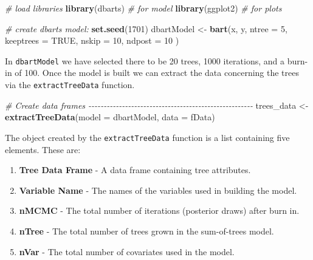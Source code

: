 \documentclass[
]{article}
\newenvironment{Shaded}{\begin{snugshade}}{\end{snugshade}}
\newcommand{\AttributeTok}[1]{\textcolor[rgb]{0.13,0.29,0.53}{#1}}
\newcommand{\CommentTok}[1]{\textcolor[rgb]{0.56,0.35,0.01}{\textit{#1}}}
\newcommand{\ConstantTok}[1]{\textcolor[rgb]{0.56,0.35,0.01}{#1}}
\newcommand{\DecValTok}[1]{\textcolor[rgb]{0.00,0.00,0.81}{#1}}
\newcommand{\FunctionTok}[1]{\textcolor[rgb]{0.13,0.29,0.53}{\textbf{#1}}}
\newcommand{\NormalTok}[1]{#1}
\newcommand{\OtherTok}[1]{\textcolor[rgb]{0.56,0.35,0.01}{#1}}
\providecommand{\tightlist}{%
  \setlength{\itemsep}{0pt}\setlength{\parskip}{0pt}}
\begin{document}
\begin{Shaded}
\begin{Highlighting}[]
\CommentTok{\# load libraries}
\FunctionTok{library}\NormalTok{(dbarts) }\CommentTok{\# for model}
\FunctionTok{library}\NormalTok{(ggplot2) }\CommentTok{\# for plots}
\end{Highlighting}
\end{Shaded}

\begin{Shaded}
\begin{Highlighting}[]

\CommentTok{\# create dbarts model:}
\FunctionTok{set.seed}\NormalTok{(}\DecValTok{1701}\NormalTok{)}
\NormalTok{dbartModel }\OtherTok{\textless{}{-}} \FunctionTok{bart}\NormalTok{(x,}
\NormalTok{                   y,}
                   \AttributeTok{ntree =} \DecValTok{5}\NormalTok{,}
                   \AttributeTok{keeptrees =} \ConstantTok{TRUE}\NormalTok{,}
                   \AttributeTok{nskip =} \DecValTok{10}\NormalTok{,}
                   \AttributeTok{ndpost =} \DecValTok{10}
\NormalTok{)}
\end{Highlighting}
\end{Shaded}

In \texttt{dbartModel} we have selected there to be 20 trees, 1000
iterations, and a burn-in of 100. Once the model is built we can extract
the data concerning the trees via the \texttt{extractTreeData} function.

\begin{Shaded}
\begin{Highlighting}[]
\CommentTok{\# Create data frames {-}{-}{-}{-}{-}{-}{-}{-}{-}{-}{-}{-}{-}{-}{-}{-}{-}{-}{-}{-}{-}{-}{-}{-}{-}{-}{-}{-}{-}{-}{-}{-}{-}{-}{-}{-}{-}{-}{-}{-}{-}{-}{-}{-}{-}{-}{-}{-}{-}{-}{-}{-}{-}{-}}
\NormalTok{trees\_data }\OtherTok{\textless{}{-}} \FunctionTok{extractTreeData}\NormalTok{(}\AttributeTok{model =}\NormalTok{ dbartModel, }\AttributeTok{data =}\NormalTok{ fData)}
\end{Highlighting}
\end{Shaded}

The object created by the \texttt{extractTreeData} function is a list
containing five elements. These are:

\begin{enumerate}
\def\labelenumi{\arabic{enumi}.}
\tightlist
\item
  \textbf{Tree Data Frame} - A data frame containing tree attributes.
\item
  \textbf{Variable Name} - The names of the variables used in building
  the model.
\item
  \textbf{nMCMC} - The total number of iterations (posterior draws)
  after burn in.
\item
  \textbf{nTree} - The total number of trees grown in the sum-of-trees
  model.
\item
  \textbf{nVar} - The total number of covariates used in the model.
\end{enumerate}
\end{document}
